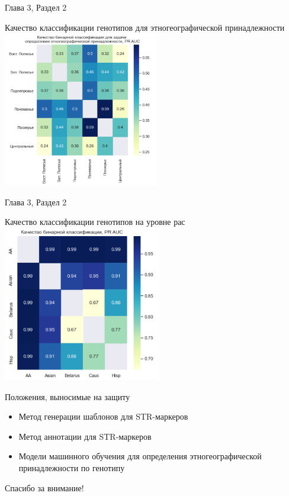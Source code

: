 \documentclass[8pt]{beamer}
\begin{document}
\begin{frame}{Глава 3, Раздел 2}
    \begin{block}{Качество классификации генотипов для этногеографической принадлежности}
        \includegraphics[height=6.8cm]{images/bel_reg_pr_auc.png}
        \centering
    \end{block}
\end{frame}

\begin{frame}{Глава 3, Раздел 2}
    \begin{block}{Качество классификации генотипов на уровне рас}
        \includegraphics[height=6.8cm]{images/bel_us_pr.png}
        \centering
    \end{block}
\end{frame}

\begin{frame}{Положения, выносимые на защиту}
    \begin{itemize}
        \item Метод генерации шаблонов для STR-маркеров
        \item Метод аннотации для STR-маркеров
        \item Модели машинного обучения для определения этногеографической принадлежности по генотипу
    \end{itemize}
\end{frame}


\begin{frame}
\huge{\centerline{Спасибо за внимание!}}
\end{frame}
\end{document}
